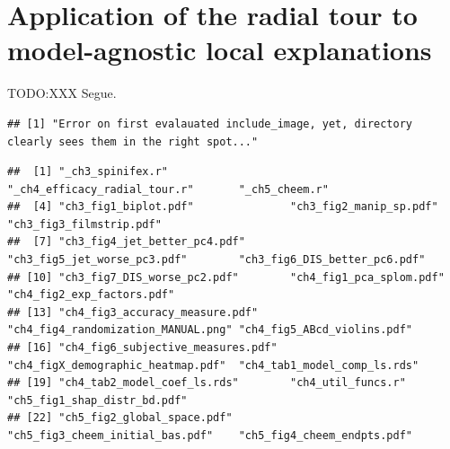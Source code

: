 \documentclass{template/monashthesis}
\begin{document}
\hypertarget{ch:cheem}{%
\chapter{Application of the radial tour to model-agnostic local explanations}\label{ch:cheem}}

TODO:XXX Segue.

\begin{Shaded}
\begin{Highlighting}[]
\SpecialCharTok{::}\SpecialCharTok{$}\NormalTok{(}
   \DocumentationTok{\#\#\# }
   \NormalTok{)}

\end{Highlighting}
\end{Shaded}

\begin{verbatim}
## [1] "Error on first evalauated include_image, yet, directory clearly sees them in the right spot..."
\end{verbatim}

\begin{Shaded}
\begin{Highlighting}[]
\NormalTok{(}\NormalTok{)}
\end{Highlighting}
\end{Shaded}

\begin{verbatim}
##  [1] "_ch3_spinifex.r"                   "_ch4_efficacy_radial_tour.r"       "_ch5_cheem.r"                     
##  [4] "ch3_fig1_biplot.pdf"               "ch3_fig2_manip_sp.pdf"             "ch3_fig3_filmstrip.pdf"           
##  [7] "ch3_fig4_jet_better_pc4.pdf"       "ch3_fig5_jet_worse_pc3.pdf"        "ch3_fig6_DIS_better_pc6.pdf"      
## [10] "ch3_fig7_DIS_worse_pc2.pdf"        "ch4_fig1_pca_splom.pdf"            "ch4_fig2_exp_factors.pdf"         
## [13] "ch4_fig3_accuracy_measure.pdf"     "ch4_fig4_randomization_MANUAL.png" "ch4_fig5_ABcd_violins.pdf"        
## [16] "ch4_fig6_subjective_measures.pdf"  "ch4_figX_demographic_heatmap.pdf"  "ch4_tab1_model_comp_ls.rds"       
## [19] "ch4_tab2_model_coef_ls.rds"        "ch4_util_funcs.r"                  "ch5_fig1_shap_distr_bd.pdf"       
## [22] "ch5_fig2_global_space.pdf"         "ch5_fig3_cheem_initial_bas.pdf"    "ch5_fig4_cheem_endpts.pdf"
\end{verbatim}
\end{document}

